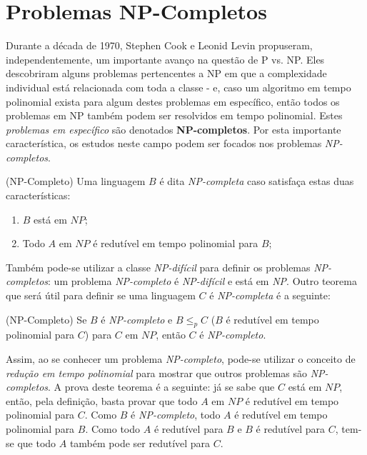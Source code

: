 \newpage
\newpage

\section{Problemas NP-Completos}

Durante a década de 1970, Stephen Cook e Leonid Levin propuseram, independentemente, um importante avanço na questão de P vs. NP. Eles descobriram alguns problemas pertencentes a NP em que a complexidade individual está relacionada com toda a classe - e, caso um algoritmo em tempo polinomial exista para algum destes problemas em específico, então todos os problemas em NP também podem ser resolvidos em tempo polinomial. Estes \textit{problemas em específico} são denotados \textbf{NP-completos}. Por esta importante característica, os estudos neste campo podem ser focados nos problemas \textit{NP-completos}.

\begin{definition}{(NP-Completo)}
Uma linguagem $B$ é dita \textit{NP-completa} caso satisfaça estas duas características:
\begin{enumerate}[nosep]
    \item $B$ está em $NP$;
    \item Todo $A$ em $NP$ é redutível em tempo polinomial para $B$;
\end{enumerate}
\end{definition}

Também pode-se utilizar a classe \textit{NP-difícil} para definir os problemas \textit{NP-completos}: um problema \textit{NP-completo} é \textit{NP-difícil} e está em \textit{NP}. Outro teorema que será útil para definir se uma linguagem $C$ é \textit{NP-completa} é a seguinte:

\begin{theorem}{(NP-Completo)}
Se $B$ é \textit{NP-completo} e $B \leq_p C$ ($B$ é redutível em tempo polinomial para $C$) para $C$ em $NP$, então $C$ é \textit{NP-completo}.
\end{theorem}

Assim, ao se conhecer um problema \textit{NP-completo}, pode-se utilizar o conceito de \textit{redução em tempo polinomial} para mostrar que outros problemas são \textit{NP-completos}. A prova deste teorema é a seguinte: já se sabe que $C$ está em $NP$, então, pela definição, basta provar que todo $A$ em $NP$ é redutível em tempo polinomial para $C$. Como $B$ é \textit{NP-completo}, todo $A$ é redutível em tempo polinomial para $B$. Como todo $A$ é redutível para $B$ e $B$ é redutível para $C$, tem-se que todo $A$ também pode ser redutível para $C$.


